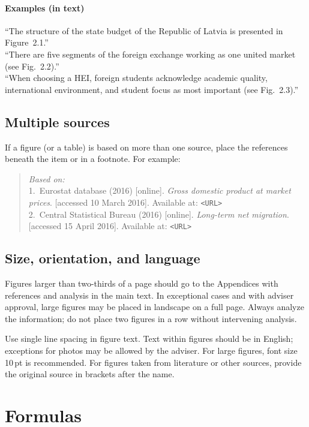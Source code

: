 \paragraph*{Examples (in text)}
``The structure of the state budget of the Republic of Latvia is presented in Figure~2.1.'' \\
``There are five segments of the foreign exchange working as one united market (see Fig.~2.2).'' \\
``When choosing a HEI, foreign students acknowledge academic quality, international environment, and student focus as most important (see Fig.~2.3).''

\subsection*{Multiple sources}
If a figure (or a table) is based on more than one source, place the references beneath the item or in a footnote. For example:
\begin{quote}
\textit{Based on:}\\
1.~Eurostat database (2016) [online]. \textit{Gross domestic product at market prices}. [accessed 10 March 2016]. Available at: \texttt{<URL>}\\
2.~Central Statistical Bureau (2016) [online]. \textit{Long-term net migration}. [accessed 15 April 2016]. Available at: \texttt{<URL>}
\end{quote}

\subsection*{Size, orientation, and language}
Figures larger than two-thirds of a page should go to the Appendices with references and analysis in the main text. In exceptional cases and with adviser approval, large figures may be placed in landscape on a full page. Always analyze the information; do not place two figures in a row without intervening analysis.

Use single line spacing in figure text. Text within figures should be in English; exceptions for photos may be allowed by the adviser. For large figures, font size 10\,pt is recommended. For figures taken from literature or other sources, provide the original source in brackets after the name.

\section{Formulas}


